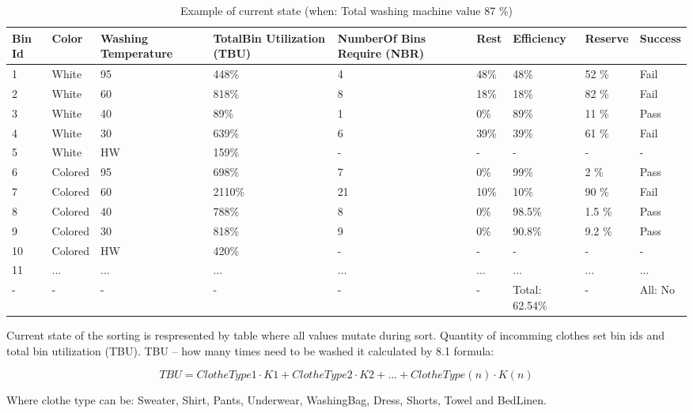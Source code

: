\begin{table}[h]
	
    \begin{tabular}{ | p{0.4cm} | p{1cm} | p{2cm} | p{1.7cm} |p{2cm} |p{1cm} |p{1.3cm} |p{1.2cm} |p{1.3cm} |}
    \hline
	Bin Id & Color & Washing Temperature & TotalBin Utilization (TBU) & NumberOf Bins Require (NBR) & Rest & Efficiency & Reserve & Success\\ \hline
	1 & White & 95 & 448\% & 4 & 48\% & 48\% & 52 \% & Fail \\ \hline
	2 & White & 60 & 818\% & 8 & 18\% & 18\% & 82 \% & Fail \\ \hline
	3 & White & 40 & 89\% & 1 & 0\% & 89\% & 11 \% & Pass \\ \hline
	4 & White & 30 & 639\% & 6 & 39\% & 39\% & 61 \% & Fail \\ \hline
	5 & White & HW & 159\% & - & - & - & - & - \\ \hline
	6 & Colored & 95 & 698\% & 7 & 0\% & 99\% & 2 \% & Pass \\ \hline
	7 & Colored & 60 & 2110\% & 21 & 10\% & 10\% & 90 \% & Fail \\ \hline
	8 & Colored & 40 & 788\% & 8 & 0\% & 98.5\% & 1.5 \% & Pass \\ \hline
	9 & Colored & 30 & 818\% & 9 & 0\% & 90.8\% & 9.2 \% & Pass \\ \hline
	10 & Colored & HW & 420\% & - & - & - & - & - \\ \hline
	11 & ... & ... & ... & ... & ... & ... & ... & ... \\ \hline
	- & - & - & - & - & - & Total: 62.54\% & - & All: No \\ \hline
    \end{tabular}
	\caption{Example of current state (when: Total washing machine value 87 \%)}
	\label{tab:currentState}
\end{table}

\newpage
Current state of the sorting is respresented by table where all values mutate during sort. Quantity of incomming clothes set bin ids and total bin utilization (TBU). TBU – how many times need to be washed it calculated by 8.1 formula:

\begin{equation}
TBU=ClotheType1\cdot K1+ClotheType2\cdot K2+...+ClotheType(n)\cdot K(n) \label{eq:eq1}
\end{equation}


Where clothe type can be: Sweater, Shirt, Pants, Underwear, WashingBag, Dress, Shorts, Towel and BedLinen. 

